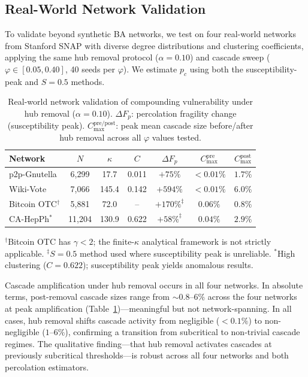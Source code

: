 \documentclass[aps,pre,twocolumn,superscriptaddress,showpacs]{revtex4-2}
\newcommand{\pc}{p_c}
\newcommand{\DF}{\Delta F}
\begin{document}
\subsection{Real-World Network Validation}
\label{sec:realworld}

To validate beyond synthetic BA networks, we test on four real-world networks from Stanford SNAP with diverse degree distributions and clustering coefficients, applying the same hub removal protocol ($\alpha=0.10$) and cascade sweep ($\varphi \in [0.05, 0.40]$, 40 seeds per $\varphi$). We estimate $\pc$ using both the susceptibility-peak and $S=0.5$ methods.

\begin{table}[h]
\caption{Real-world network validation of compounding vulnerability under hub removal ($\alpha=0.10$). $\DF_p$: percolation fragility change (susceptibility peak). $C_{\max}^{\mathrm{pre/post}}$: peak mean cascade size before/after hub removal across all $\varphi$ values tested.}
\label{tab:realworld}
\begin{ruledtabular}
\begin{tabular}{lcccccc}
Network & $N$ & $\kappa$ & $C$ & $\DF_p$ & $C_{\max}^{\mathrm{pre}}$ & $C_{\max}^{\mathrm{post}}$ \\
\hline
p2p-Gnutella & 6{,}299 & 17.7 & 0.011 & $+75\%$ & $<0.01\%$ & $1.7\%$ \\
Wiki-Vote & 7{,}066 & 145.4 & 0.142 & $+594\%$ & $<0.01\%$ & $6.0\%$ \\
Bitcoin OTC$^\dag$ & 5{,}881 & 72.0 & -- & $+170\%^\ddag$ & $0.06\%$ & $0.8\%$ \\
CA-HepPh$^*$ & 11{,}204 & 130.9 & 0.622 & $+58\%^\ddag$ & $0.04\%$ & $2.9\%$ \\
\end{tabular}
\end{ruledtabular}
$^\dag$Bitcoin OTC has $\gamma < 2$; the finite-$\kappa$ analytical framework is not strictly applicable.
$^\ddag$$S=0.5$ method used where susceptibility peak is unreliable.
$^*$High clustering ($C=0.622$); susceptibility peak yields anomalous results.
\end{table}

Cascade amplification under hub removal occurs in all four networks. In absolute terms, post-removal cascade sizes range from ${\sim}0.8$--$6\%$ across the four networks at peak amplification (Table~\ref{tab:realworld})---meaningful but not network-spanning. In all cases, hub removal shifts cascade activity from negligible ($<0.1\%$) to non-negligible ($1$--$6\%$), confirming a transition from subcritical to non-trivial cascade regimes. The qualitative finding---that hub removal activates cascades at previously subcritical thresholds---is robust across all four networks and both percolation estimators.
\end{document}
